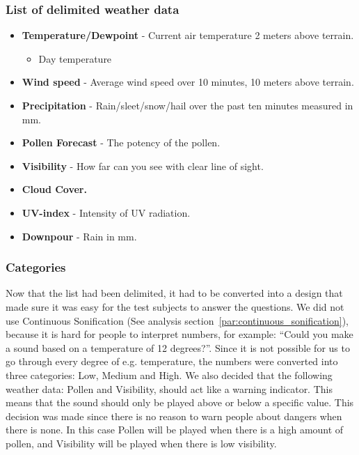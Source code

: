 

\subsubsection*{List of delimited weather data} %
\label{ssub:list_of_delimited_weather_data}

\begin{itemize}
     \item \textbf{Temperature/Dewpoint} - Current air temperature 2 meters above terrain.
     \begin{itemize}
         \item Day temperature
     \end{itemize}
     \item \textbf{Wind speed} - Average wind speed over 10 minutes, 10 meters above terrain.
     \item \textbf{Precipitation} - Rain/sleet/snow/hail over the past ten minutes measured in mm.
     \item \textbf{Pollen Forecast} - The potency of the pollen.
     \item \textbf{Visibility} - How far can you see with clear line of sight.
     \item \textbf{Cloud Cover.}
     \item \textbf{UV-index} - Intensity of UV radiation.
     \item \textbf{Downpour} - Rain in mm.
 \end{itemize}



\subsubsection{Categories} %
\label{ssub:categories}

Now that the list had been delimited, it had to be converted into a design that made sure it was easy for the test subjects to answer the questions. 
We did not use Continuous Sonification (See analysis section~\ref{par:continuous_sonification}), because it is hard for people to interpret numbers, for example: \enquote{Could you make a sound based on a temperature of 12 degrees?}. 
Since it is not possible for us to go through every degree of e.g. temperature, the numbers were converted into three categories: Low, Medium and High. 
We also decided that the following weather data: Pollen and Visibility, should act like a warning indicator. 
This means that the sound should only be played above or below a specific value.
This decision was made since there is no reason to warn people about dangers when there is none. 
In this case Pollen will be played when there is a high amount of pollen, and Visibility will be played when there is low visibility.

